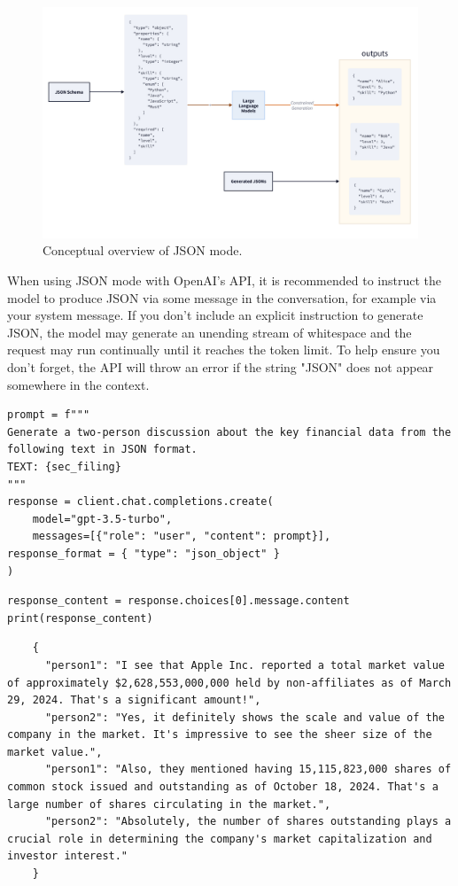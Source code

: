 \begin{figure}[htbp]
\centering
\includegraphics[scale=0.5]{../_static/structured_output/json.png}
\caption{Conceptual overview of JSON mode.}
\label{fig:json-mode}
\end{figure}
When using JSON mode with OpenAI's API, it is recommended to instruct the model to produce JSON via some message in the conversation, for example via your system message. If you don't include an explicit instruction to generate JSON, the model may generate an unending stream of whitespace and the request may run continually until it reaches the token limit. To help ensure you don't forget, the API will throw an error if the string "JSON" does not appear somewhere in the context.

\begin{verbatim}
prompt = f"""
Generate a two-person discussion about the key financial data from the following text in JSON format.
TEXT: {sec_filing}
"""
response = client.chat.completions.create(
    model="gpt-3.5-turbo",
    messages=[{"role": "user", "content": prompt}],
response_format = { "type": "json_object" }
)
\end{verbatim}

\begin{verbatim}
response_content = response.choices[0].message.content
print(response_content)
\end{verbatim}
    \begin{verbatim}
    {
      "person1": "I see that Apple Inc. reported a total market value of approximately $2,628,553,000,000 held by non-affiliates as of March 29, 2024. That's a significant amount!",
      "person2": "Yes, it definitely shows the scale and value of the company in the market. It's impressive to see the sheer size of the market value.",
      "person1": "Also, they mentioned having 15,115,823,000 shares of common stock issued and outstanding as of October 18, 2024. That's a large number of shares circulating in the market.",
      "person2": "Absolutely, the number of shares outstanding plays a crucial role in determining the company's market capitalization and investor interest."
    }
    \end{verbatim}

